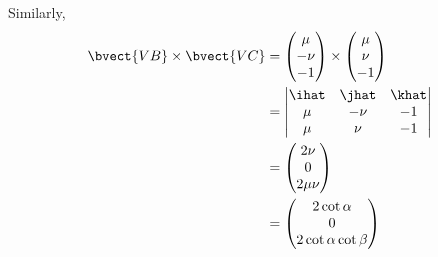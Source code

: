 \begin{enumerate}
          Similarly,
          \begin{align*}
              \bvect{VB} \times \bvect{VC} & = \begin{pmatrix}
                                                   \mu   \\
                                                   - \nu \\
                                                   - 1
                                               \end{pmatrix}
              \times
              \begin{pmatrix}
                  \mu \\
                  \nu \\
                  -1
              \end{pmatrix}                                                                   \\
                                           & = \begin{vmatrix}
                                                   \ihat & \jhat & \khat \\
                                                   \mu   & -\nu  & -1    \\
                                                   \mu   & \nu   & -1
                                               \end{vmatrix}                           \\
                                           & = \begin{pmatrix}
                                                   2 \nu \\
                                                   0     \\
                                                   2 \mu \nu
                                               \end{pmatrix}                                  \\
                                           & = \begin{pmatrix}
                                                   2 \cot \alpha \\
                                                   0             \\
                                                   2 \cot \alpha \cot \beta
                                               \end{pmatrix}                         \\

\end{align*}
\end{enumerate}
